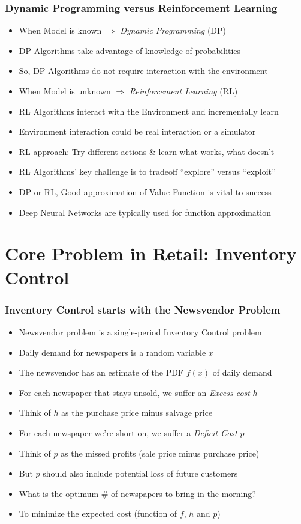 \documentclass[handout]{beamer}
\begin{document}
\begin{frame}
\frametitle{Dynamic Programming versus Reinforcement Learning}
\pause
\begin{itemize}[<+->]
\item When Model is known $\Rightarrow$ {\em Dynamic Programming} (DP)
\item DP Algorithms take advantage of knowledge of probabilities
\item So, DP Algorithms do not require interaction with the environment
\item When Model is unknown $\Rightarrow$ {\em Reinforcement Learning} (RL)
\item RL Algorithms interact with the Environment and incrementally learn
\item Environment interaction could be real interaction or a simulator
\item RL approach: Try different actions \& learn what works, what doesn't
\item RL Algorithms' key challenge is to tradeoff ``explore'' versus ``exploit''
\item DP or RL, Good approximation of Value Function is vital to success
\item Deep Neural Networks are typically used for function approximation
\end{itemize}
\end{frame}


\section{Core Problem in Retail: Inventory Control}

\begin{frame}
\frametitle{Inventory Control starts with the Newsvendor Problem}
\pause
\begin{itemize}[<+->]
\item Newsvendor problem is a single-period Inventory Control problem
\item Daily demand for newspapers is a random variable $x$
\item The newsvendor has an estimate of the PDF $f(x)$ of daily demand
\item For each newspaper that stays unsold, we suffer an {\em Excess cost} $h$
\item Think of $h$ as the purchase price minus salvage price
\item For each newspaper we're short on, we suffer a {\em Deficit Cost} $p$
\item Think of $p$ as the missed profits (sale price minus purchase price)
\item But $p$ should also include potential loss of future customers
\item What is the optimum \# of newspapers to bring in the morning?
\item To minimize the expected cost (function of $f$, $h$ and $p$)
\end{itemize}
\end{frame}
\end{document}
